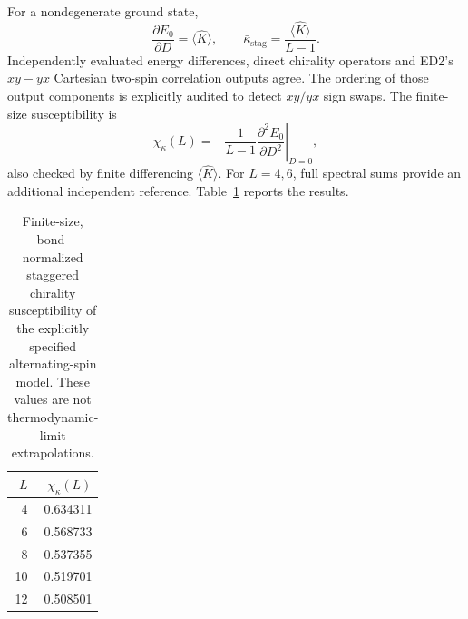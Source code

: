 \documentclass[preprint,12pt,nopreprintline]{elsarticle}
\begin{document}
For a nondegenerate ground state,
\begin{equation}
\frac{\partial E_0}{\partial D}=\langle\hat K\rangle,
\qquad
\bar\kappa_{\mathrm{stag}}=\frac{\langle\hat K\rangle}{L-1}.
\label{eq:hf}
\end{equation}
Independently evaluated energy differences, direct
chirality operators and ED2's $xy-yx$ Cartesian
two-spin correlation outputs agree. The ordering
of those output components is explicitly audited
to detect $xy/yx$ sign swaps.
The finite-size susceptibility is
\begin{equation}
\chi_\kappa(L)=-\frac{1}{L-1}
\left.\frac{\partial^2E_0}{\partial D^2}\right|_{D=0},
\label{eq:susc}
\end{equation}
also checked by finite differencing $\langle\hat K\rangle$.
For $L=4,6$, full spectral sums provide an additional
independent reference. Table~\ref{tab:susc} reports the results.

\begin{table}[t]
\centering
\caption{Finite-size, bond-normalized staggered chirality susceptibility
of the explicitly specified alternating-spin model. These values
are not thermodynamic-limit extrapolations.}
\label{tab:susc}
\begin{tabular}{rr}
\toprule
$L$ & $\chi_\kappa(L)$\\
\midrule
4 & 0.634311\\
6 & 0.568733\\
8 & 0.537355\\
10 & 0.519701\\
12 & 0.508501\\
\bottomrule
\end{tabular}
\end{table}
\end{document}
